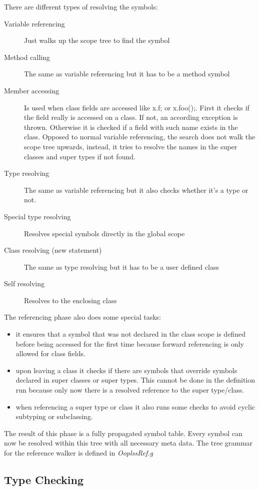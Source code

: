 There are different types of resolving the symbols:
\begin{description}
\item[Variable referencing]
Just walks up the scope tree to find the symbol 
\item[Method calling]
The same as variable referencing but it has to be a method symbol
\item[Member accessing]
Is used when class fields are accessed like x.f; or x.foo();. First it checks
if the field really is accessed on a class. If not, an according exception
is thrown. Otherwise it is checked if a field with such name exists
in the class. Opposed to normal variable referencing, the search does not walk
the scope tree upwards, instead, it tries to resolve the names in the super classes
and super types if not found.
\item[Type resolving]
The same as variable referencing but it also checks whether it's a type or not.
\item[Special type resolving]
Resolves special symbols directly in the global scope
\item[Class resolving (new statement)]
The same as type resolving but it has to be a user defined class
\item[Self resolving]
Resolves to the enclosing class
\end{description}

The referencing phase also does some special tasks:
\begin{itemize}
\item it ensures that a symbol that was not declared in the class scope is 
defined before being accessed for the first time because forward referencing 
is only allowed for class fields.
\item upon leaving a class it checks if there are symbols that override symbols
declared in super classes or super types. This cannot be done in the definition run
because only now there is a resolved reference to the super type/class.
\item when referencing a super type or class it also runs some checks to avoid
cyclic subtyping or subclassing.
\end{itemize}

The result of this phase is a fully propagated symbol table. Every symbol can
now be resolved within this tree with all necessary meta data. The tree grammar
for the reference walker is defined in \emph{OoplssRef.g}

\subsection{Type Checking}

